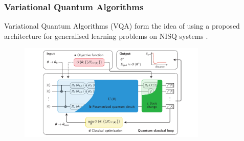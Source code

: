 


\begin{frame}
    \frametitle{Variational Quantum Algorithms}

    Variational Quantum Algorithms (VQA) form the idea of using a proposed
    architecture for generalised learning problems on NISQ systems
    \cite{bharti2021noisy}.

    \begin{figure}
        \includegraphics[width=0.8\textwidth]{figures/vqaarch.pdf}
    \end{figure}
\end{frame}


